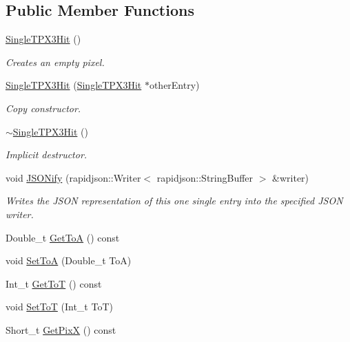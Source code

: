 \subsection*{Public Member Functions}
\begin{DoxyCompactItemize}
\item 
\hyperlink{classSingleTPX3Hit_af7d8fdcb55b9802cef7b6a3a2cf88450}{Single\+T\+P\+X3\+Hit} ()
\begin{DoxyCompactList}\small\item\em Creates an empty pixel. \end{DoxyCompactList}\item 
\hyperlink{classSingleTPX3Hit_a238378908a145ad96724345068426be3}{Single\+T\+P\+X3\+Hit} (\hyperlink{classSingleTPX3Hit}{Single\+T\+P\+X3\+Hit} $\ast$other\+Entry)
\begin{DoxyCompactList}\small\item\em Copy constructor. \end{DoxyCompactList}\item 
\hyperlink{classSingleTPX3Hit_af3888234a3939c8f5f1ae8dd72c0ef15}{$\sim$\+Single\+T\+P\+X3\+Hit} ()
\begin{DoxyCompactList}\small\item\em Implicit destructor. \end{DoxyCompactList}\item 
void \hyperlink{classSingleTPX3Hit_aaa523b209e9f72fce0c6f9ca0b565b17}{J\+S\+O\+Nify} (rapidjson\+::\+Writer$<$ rapidjson\+::\+String\+Buffer $>$ \&writer)
\begin{DoxyCompactList}\small\item\em Writes the J\+S\+O\+N representation of this one single entry into the specified J\+S\+O\+N writer. \end{DoxyCompactList}\item 
Double\+\_\+t \hyperlink{classSingleTPX3Hit_a9b53a0043ece9c60acb6615e0cf7e142}{Get\+To\+A} () const 
\item 
void \hyperlink{classSingleTPX3Hit_a0bb6d17238f197cc23dfcb98f02736aa}{Set\+To\+A} (Double\+\_\+t To\+A)
\item 
Int\+\_\+t \hyperlink{classSingleTPX3Hit_a53a1b6dc1a7ddbeb1b7d37fdbc1cc98d}{Get\+To\+T} () const 
\item 
void \hyperlink{classSingleTPX3Hit_a6a0ed33ed744f5bed88a41ba811ebb18}{Set\+To\+T} (Int\+\_\+t To\+T)
\item 
Short\+\_\+t \hyperlink{classSingleTPX3Hit_a98b2879ed4dd11965a05b4e0c1b3040e}{Get\+Pix\+X} () const 
\item 

\end{DoxyCompactItemize}
